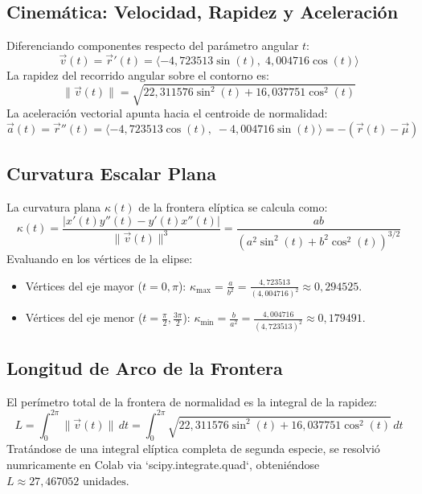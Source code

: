 \documentclass[12pt,a4paper]{article}
\begin{document}
\subsection{Cinemática: Velocidad, Rapidez y Aceleración}
Diferenciando componentes respecto del parámetro angular $t$:
\begin{equation}
\vec{v}(t) = \vec{r}'(t) = \langle -4{,}723513 \sin(t), \; 4{,}004716 \cos(t) \rangle
\end{equation}
La rapidez del recorrido angular sobre el contorno es:
\begin{equation}
\|\vec{v}(t)\| = \sqrt{22{,}311576 \sin^2(t) + 16{,}037751 \cos^2(t)}
\end{equation}
La aceleración vectorial apunta hacia el centroide de normalidad:
\begin{equation}
\vec{a}(t) = \vec{r}''(t) = \langle -4{,}723513 \cos(t), \; -4{,}004716 \sin(t) \rangle = -(\vec{r}(t) - \vec{\mu})
\end{equation}

\subsection{Curvatura Escalar Plana}
La curvatura plana $\kappa(t)$ de la frontera elíptica se calcula como:
\begin{equation}
\kappa(t) = \frac{|x'(t)y''(t) - y'(t)x''(t)|}{\|\vec{v}(t)\|^3} = \frac{a b}{(a^2 \sin^2(t) + b^2 \cos^2(t))^{3/2}}
\end{equation}
Evaluando en los vértices de la elipse:
\begin{itemize}
    \item Vértices del eje mayor ($t = 0, \pi$): $\kappa_{\max} = \frac{a}{b^2} = \frac{4{,}723513}{(4{,}004716)^2} \approx 0{,}294525$.
    \item Vértices del eje menor ($t = \frac{\pi}{2}, \frac{3\pi}{2}$): $\kappa_{\min} = \frac{b}{a^2} = \frac{4{,}004716}{(4{,}723513)^2} \approx 0{,}179491$.
\end{itemize}

\subsection{Longitud de Arco de la Frontera}
El perímetro total de la frontera de normalidad es la integral de la rapidez:
\begin{equation}
L = \int_{0}^{2\pi} \|\vec{v}(t)\| \, dt = \int_{0}^{2\pi} \sqrt{22{,}311576 \sin^2(t) + 16{,}037751 \cos^2(t)} \, dt
\end{equation}
Tratándose de una integral elíptica completa de segunda especie, se resolvió numricamente en Colab via `scipy.integrate.quad`, obteniéndose $L \approx 27{,}467052 \text{ unidades}$.
\end{document}
